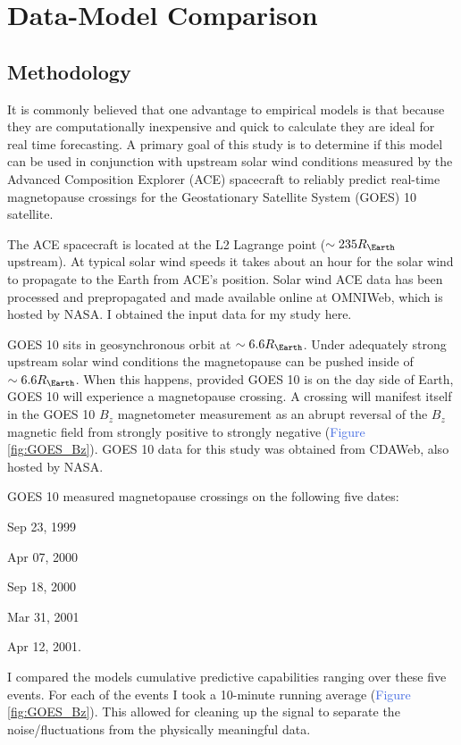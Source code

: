 \documentclass[12pt, letterpaper]{article}
\begin{document}
\section{Data-Model Comparison}
\label{sec:data-model}
\subsection{Methodology}
It is commonly believed that one advantage to empirical models is that because they are computationally inexpensive and quick to calculate they are ideal for real time forecasting. A primary goal of this study is to determine if this model can be used in conjunction with upstream solar wind conditions measured by the Advanced Composition Explorer (ACE) spacecraft to reliably predict real-time magnetopause crossings for the Geostationary Satellite System (GOES) 10 satellite.

The ACE spacecraft is located at the L2 Lagrange point ($\sim 235 R_{\Earth}$ upstream). At typical solar wind speeds it takes about an hour for the solar wind to propagate to the Earth from ACE's position. Solar wind ACE data has been processed and prepropagated and made available online at OMNIWeb, which is hosted by NASA. I obtained the input data for my study here.

GOES 10 sits in geosynchronous orbit at $\sim 6.6 R_{\Earth}$. Under adequately strong upstream solar wind conditions the magnetopause can be pushed inside of $\sim 6.6 R_{\Earth}$. When this happens, provided GOES 10 is on the day side of Earth, GOES 10 will experience a magnetopause crossing. A crossing will manifest itself in the GOES 10 $B_{z}$ magnetometer measurement as an abrupt reversal of the $B_{z}$ magnetic field from strongly positive to strongly negative (\textcolor{RoyalBlue}{Figure \ref{fig:GOES_Bz}}). GOES 10 data for this study was obtained from CDAWeb, also hosted by NASA.

GOES 10 measured magnetopause crossings on the following five dates:
\begin{inparaenum}[$\cdot$]
  \item Sep 23, 1999
  \item Apr 07, 2000
  \item Sep 18, 2000
  \item Mar 31, 2001
  \item Apr 12, 2001.
\end{inparaenum}
I compared the models cumulative predictive capabilities ranging over these five events. For each of the events I took a 10-minute running average (\textcolor{RoyalBlue}{Figure \ref{fig:GOES_Bz}}). This allowed for cleaning up the signal to separate the noise/fluctuations from the physically meaningful data.
\end{document}
